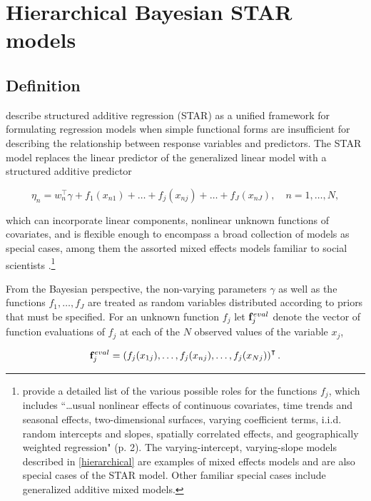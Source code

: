 \section{Hierarchical Bayesian STAR models}
\label{star}

\subsection{Definition}

 describe structured additive regression (STAR) 
as a unified framework for formulating regression models when simple functional forms are 
insufficient for describing the relationship between response variables and predictors. 
The STAR model replaces the linear predictor of the 
generalized linear model with a structured additive predictor

\begin{equation*}
  \eta_n =  w_n^\intercal\gamma + f_1(x_{n1}) + \ldots + f_j(x_{nj}) + \ldots + f_J(x_{nJ}), \quad n = 1, \dots, N, 
\end{equation*}

\noindent which can incorporate linear components, nonlinear unknown functions of covariates, 
and is flexible enough to encompass a broad collection of models as special cases, among them the 
assorted mixed effects models familiar to social scientists 
.\footnote{ 
provide a detailed list of the various possible roles for the functions $f_j$, which includes ``\dots usual 
nonlinear effects of continuous covariates, time trends and seasonal effects, two-dimensional surfaces, 
varying coefficient terms, i.i.d. random intercepts and slopes, spatially correlated effects, and geographically 
weighted regression" (p. 2). The varying-intercept, varying-slope models described in \ref{hierarchical} 
are examples of mixed effects models and are also special cases of the STAR model. Other familiar 
special cases include generalized additive mixed models.} 

From the Bayesian perspective, the non-varying parameters $\gamma$ as well as the 
functions $f_1, \dots, f_J$ are treated as random variables distributed according to priors that must 
be specified. For an unknown function $f_j$ let $\mathbf{f}_j^{eval}$ denote the vector of function 
evaluations of $f_j$ at each of the $N$ observed values of the variable $x_j$, 

\begin{equation*}
\mathbf{f}_j^{eval} = \left(f_j(x_{1j}), \dots, f_j(x_{nj}), \dots, f_j(x_{Nj})\right)^\intercal.  
 \end{equation*}
 
